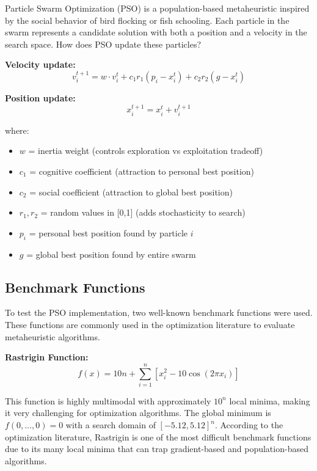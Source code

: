 \documentclass[letterpaper]{article}
\begin{document}
Particle Swarm Optimization (PSO) is a population-based metaheuristic inspired by the social behavior of bird flocking or fish schooling. Each particle in the swarm represents a candidate solution with both a position and a velocity in the search space. How does PSO update these particles?

\textbf{Velocity update:}
\begin{equation}
v_i^{t+1} = w \cdot v_i^t + c_1 r_1 (p_i - x_i^t) + c_2 r_2 (g - x_i^t)
\end{equation}

\textbf{Position update:}
\begin{equation}
x_i^{t+1} = x_i^t + v_i^{t+1}
\end{equation}

where:
\begin{itemize}
\item $w$ = inertia weight (controls exploration vs exploitation tradeoff)
\item $c_1$ = cognitive coefficient (attraction to personal best position)
\item $c_2$ = social coefficient (attraction to global best position)
\item $r_1, r_2$ = random values in [0,1] (adds stochasticity to search)
\item $p_i$ = personal best position found by particle $i$
\item $g$ = global best position found by entire swarm
\end{itemize}

\subsection{Benchmark Functions}

To test the PSO implementation, two well-known benchmark functions were used. These functions are commonly used in the optimization literature to evaluate metaheuristic algorithms.

\textbf{Rastrigin Function:}
\begin{equation}
f(x) = 10n + \sum_{i=1}^n [x_i^2 - 10\cos(2\pi x_i)]
\end{equation}

This function is highly multimodal with approximately $10^n$ local minima, making it very challenging for optimization algorithms. The global minimum is $f(0,\ldots,0) = 0$ with a search domain of $[-5.12, 5.12]^n$. According to the optimization literature, Rastrigin is one of the most difficult benchmark functions due to its many local minima that can trap gradient-based and population-based algorithms.
\end{document}
